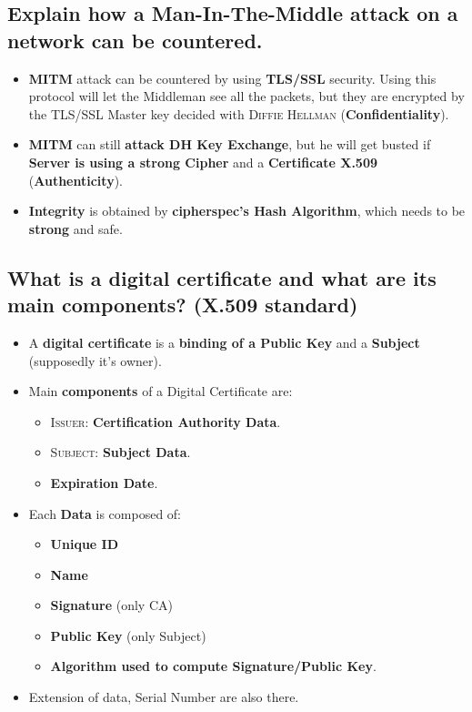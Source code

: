 \documentclass[9pt, letterpaper]{article}
\begin{document}
\subsection{Explain how a Man-In-The-Middle attack on a network can be countered.}
\begin{itemize}
	\item \textbf{MITM} attack can be countered by using \textbf{TLS/SSL} security. Using this protocol will let the Middleman see all the packets, but they are encrypted by the TLS/SSL Master key decided with \textsc{Diffie Hellman} (\textbf{Confidentiality}).
	\item \textbf{MITM} can still \textbf{attack DH Key Exchange}, but he will get busted if \textbf{Server is using a strong Cipher} and a \textbf{Certificate X.509} (\textbf{Authenticity}).
	\item \textbf{Integrity} is obtained by \textbf{cipherspec's Hash Algorithm}, which needs to be \textbf{strong} and safe.
\end{itemize}

\subsection{What is a digital certificate and what are its main components? (X.509 standard)}
\begin{itemize}
	\item A \textbf{digital certificate} is a \textbf{binding of a Public Key} and a \textbf{Subject} (supposedly it's owner).
	\item Main \textbf{components} of a Digital Certificate are:
	      \begin{itemize}
		      \item \textsc{Issuer}: \textbf{Certification Authority Data}.
		      \item \textsc{Subject}: \textbf{Subject Data}.
		      \item \textbf{Expiration Date}.
	      \end{itemize}
	\item Each \textbf{Data} is composed of:
	      \begin{itemize}
		      \item \textbf{Unique ID}
		      \item \textbf{Name}
		      \item \textbf{Signature} (only CA)
		      \item \textbf{Public Key} (only Subject)
		      \item \textbf{Algorithm used to compute Signature/Public Key}.
	      \end{itemize}
	\item Extension of data, Serial Number are also there.
\end{itemize}
\end{document}
